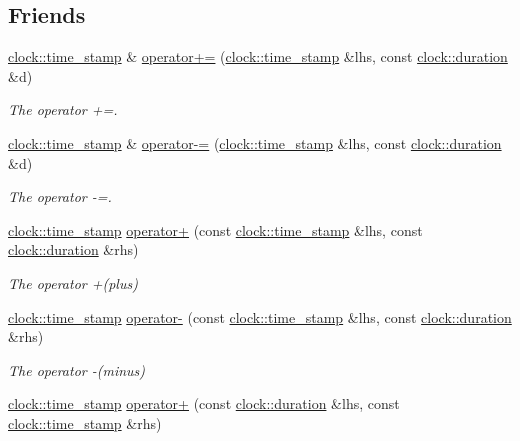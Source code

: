 \subsection*{Friends}
\begin{DoxyCompactItemize}
\item 
\hyperlink{classclock_1_1time__stamp}{clock\+::time\+\_\+stamp} \& \hyperlink{classclock_1_1duration_aac9d89cdae9b0970a13afe382dbae39e}{operator+=} (\hyperlink{classclock_1_1time__stamp}{clock\+::time\+\_\+stamp} \&lhs, const \hyperlink{classclock_1_1duration}{clock\+::duration} \&d)
\begin{DoxyCompactList}\small\item\em The operator +=. \end{DoxyCompactList}\item 
\hyperlink{classclock_1_1time__stamp}{clock\+::time\+\_\+stamp} \& \hyperlink{classclock_1_1duration_a4f3f2c1b880983fded7b2be4479dd67e}{operator-\/=} (\hyperlink{classclock_1_1time__stamp}{clock\+::time\+\_\+stamp} \&lhs, const \hyperlink{classclock_1_1duration}{clock\+::duration} \&d)
\begin{DoxyCompactList}\small\item\em The operator -\/=. \end{DoxyCompactList}\item 
\hyperlink{classclock_1_1time__stamp}{clock\+::time\+\_\+stamp} \hyperlink{classclock_1_1duration_a50a80fb73c7261d4422d85275c5e015b}{operator+} (const \hyperlink{classclock_1_1time__stamp}{clock\+::time\+\_\+stamp} \&lhs, const \hyperlink{classclock_1_1duration}{clock\+::duration} \&rhs)
\begin{DoxyCompactList}\small\item\em The operator +(plus) \end{DoxyCompactList}\item 
\hyperlink{classclock_1_1time__stamp}{clock\+::time\+\_\+stamp} \hyperlink{classclock_1_1duration_a703172077ef665f20b5f100c26eb69be}{operator-\/} (const \hyperlink{classclock_1_1time__stamp}{clock\+::time\+\_\+stamp} \&lhs, const \hyperlink{classclock_1_1duration}{clock\+::duration} \&rhs)
\begin{DoxyCompactList}\small\item\em The operator -\/(minus) \end{DoxyCompactList}\item 
\hyperlink{classclock_1_1time__stamp}{clock\+::time\+\_\+stamp} \hyperlink{classclock_1_1duration_a8dccfa10d4f3cd388c5fa488c1459897}{operator+} (const \hyperlink{classclock_1_1duration}{clock\+::duration} \&lhs, const \hyperlink{classclock_1_1time__stamp}{clock\+::time\+\_\+stamp} \&rhs)

\end{DoxyCompactItemize}
